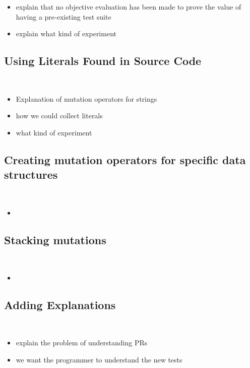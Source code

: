 \documentclass[11pt]{sdm}
\newcommand{\todo}[1]{\colorbox{Red!75}{\textcolor{white}{\textbf{TODO\ifx&#1&\else: #1\fi}}}}
\begin{document}
\begin{itemize}
  \item explain that no objective evaluation has been made to prove the value of having a pre-existing test suite
  \item explain what kind of experiment
\end{itemize}

\subsection{Using Literals Found in Source Code}
\label{mutation}
\todo{}

\begin{itemize}
  \item Explanation of mutation operators for strings
  \item how we could collect literals
  \item what kind of experiment
\end{itemize}

\subsection{Creating mutation operators for specific data structures}
\label{create_operators}
\todo{}

\begin{itemize}
  \item
\end{itemize}

\subsection{Stacking mutations}
\label{stacking}
\todo{}

\begin{itemize}
  \item
\end{itemize}

\subsection{Adding Explanations}
\label{explanation}
\todo{}

\begin{itemize}
  \item explain the problem of understanding PRs
  \item we want the programmer to understand the new tests~\cite{bessey2010few}
\end{itemize}
\end{document}
